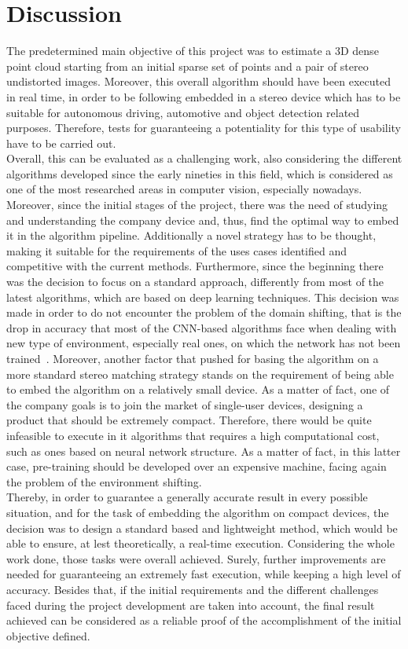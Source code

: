 \chapter{Discussion}
\label{chapter:discussion}


The predetermined main objective of this project was to estimate a 3D dense point cloud starting from an initial sparse set of points and a pair of stereo undistorted images.
Moreover, this overall algorithm should have been executed in real time, in order to be following embedded in a stereo device which has to be suitable for autonomous driving, automotive and object detection related purposes.
Therefore, tests for guaranteeing a potentiality for this type of usability have to be carried out. \\
Overall, this can be evaluated as a challenging work, also considering the different algorithms developed since the early nineties in this field, which is considered as one of the most researched areas in computer vision, especially nowadays.\\
Moreover, since the initial stages of the project, there was the need of studying and understanding the company device and, thus, find the optimal way to embed it in the algorithm pipeline.
Additionally a novel strategy has to be thought, making it suitable for the requirements of the uses cases identified and competitive with the current methods.
Furthermore, since the beginning there was the decision to focus on a standard approach, differently from most of the latest algorithms, which are based on deep learning techniques.  
This decision was made in order to do not encounter the problem of the domain shifting, that is the drop in accuracy that most of the CNN-based algorithms face when dealing with new type of environment, especially real ones, on which the network has not been trained~\cite{Poggi2019}.
Moreover, another factor that pushed for basing the algorithm on a more standard stereo matching strategy stands on the requirement of being able to embed the algorithm on a relatively small device.
As a matter of fact, one of the company goals is to join the market of single-user devices, designing a product that should be extremely compact.
Therefore, there would be quite infeasible to execute in it algorithms that requires a high computational cost, such as ones based on neural network structure.
As a matter of fact, in this latter case, pre-training should be developed over an expensive machine, facing again the problem of the environment shifting. \\
Thereby, in order to guarantee a generally accurate result in every possible situation, and for the task of embedding the algorithm on compact devices, the decision was to design a standard based and lightweight method, which would be able to ensure, at lest theoretically, a real-time execution.
Considering the whole work done, those tasks were overall achieved.
Surely, further improvements are needed for guaranteeing an extremely fast execution, while keeping a high level of accuracy.
Besides that, if the initial requirements and the different challenges faced during the project development are taken into account, the final result achieved can be considered as a reliable proof of the accomplishment of the initial objective defined.

